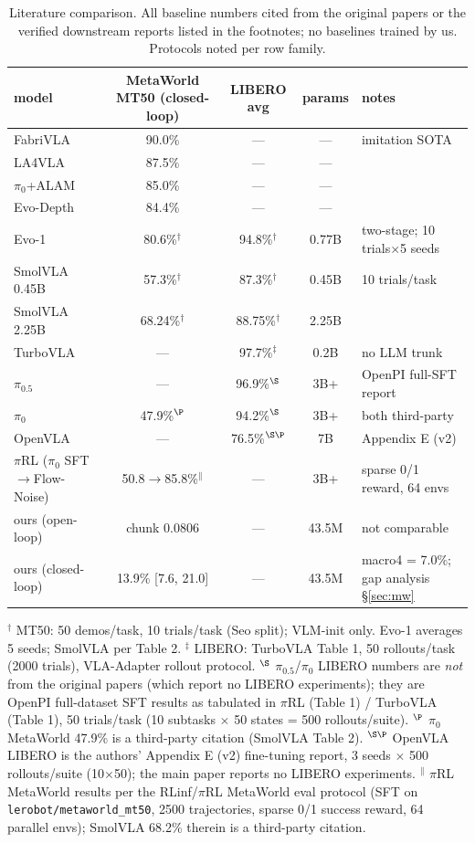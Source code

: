 \documentclass[10pt,twocolumn]{article}
\begin{document}
\begin{table}[t]
\centering\small
\caption{Literature comparison. All baseline numbers cited from the original
papers or the verified downstream reports listed in the footnotes; no baselines
trained by us. Protocols noted per row family.}
\label{tab:baselines}
\begin{tabular}{lcccl}
\toprule
model & MetaWorld MT50 (closed-loop) & LIBERO avg & params & notes \\
\midrule
FabriVLA & 90.0\% & --- & --- & imitation SOTA\\
LA4VLA & 87.5\% & --- & --- & \\
$\pi_0$+ALAM & 85.0\% & --- & --- & \\
Evo-Depth & 84.4\% & --- & --- & \\
Evo-1 & 80.6\%$^{\dagger}$ & 94.8\%$^{\dagger}$ & 0.77B & two-stage; 10 trials$\times$5 seeds\\
SmolVLA 0.45B & 57.3\%$^{\dagger}$ & 87.3\%$^{\dagger}$ & 0.45B & 10 trials/task\\
SmolVLA 2.25B & 68.24\%$^{\dagger}$ & 88.75\%$^{\dagger}$ & 2.25B & \\
TurboVLA & --- & 97.7\%$^{\ddagger}$ & 0.2B & no LLM trunk\\
$\pi_{0.5}$ & --- & 96.9\%$^{\S}$ & 3B+ & OpenPI full-SFT report\\
$\pi_0$ & 47.9\%$^{\P}$ & 94.2\%$^{\S}$ & 3B+ & both third-party\\
OpenVLA & --- & 76.5\%$^{\text{\S\P}}$ & 7B & Appendix E (v2)\\
$\pi$RL ($\pi_0$ SFT$\rightarrow$Flow-Noise) & 50.8$\rightarrow$85.8\%$^{\|}$ & --- & 3B+ & sparse 0/1 reward, 64 envs\\
\midrule
ours (open-loop) & chunk 0.0806 & --- & 43.5M & not comparable\\
ours (closed-loop) & 13.9\% [7.6, 21.0] & --- & 43.5M & macro4 = 7.0\%; gap analysis \S\ref{sec:mw}\\
\bottomrule
\end{tabular}

\smallskip
\footnotesize
$^{\dagger}$ MT50: 50 demos/task, 10 trials/task (Seo split); VLM-init only.
Evo-1 averages 5 seeds; SmolVLA per Table 2.
$^{\ddagger}$ LIBERO: TurboVLA Table 1, 50 rollouts/task (2000 trials),
VLA-Adapter rollout protocol.
$^{\S}$ $\pi_{0.5}$/$\pi_0$ LIBERO numbers are \emph{not} from the original
papers (which report no LIBERO experiments); they are OpenPI full-dataset SFT
results as tabulated in $\pi$RL (Table 1) / TurboVLA (Table 1), 50 trials/task
(10 subtasks $\times$ 50 states = 500 rollouts/suite).
$^{\P}$ $\pi_0$ MetaWorld 47.9\% is a third-party citation (SmolVLA Table 2).
$^{\text{\S\P}}$ OpenVLA LIBERO is the authors' Appendix E (v2) fine-tuning
report, 3 seeds $\times$ 500 rollouts/suite (10$\times$50); the main paper
reports no LIBERO experiments.
$^{\|}$ $\pi$RL MetaWorld results per the RLinf/$\pi$RL MetaWorld eval
protocol (SFT on \texttt{lerobot/metaworld\_mt50}, 2500 trajectories, sparse
0/1 success reward, 64 parallel envs); SmolVLA 68.2\% therein is a
third-party citation.
\end{table}
\end{document}
